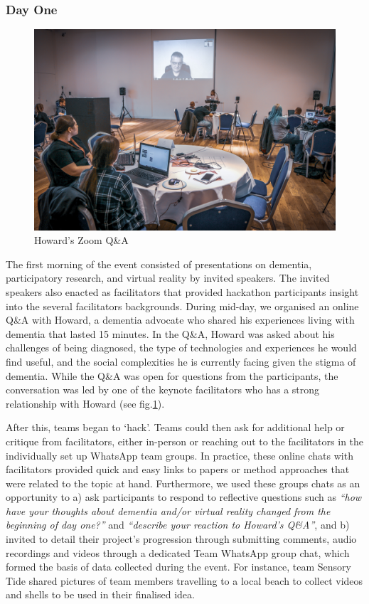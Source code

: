 \subsubsection{Day One}
\label{DayOne}

\begin{figure}[htp]
\centering
\includegraphics[width=.4\linewidth]{Images/DemVR/Howard.jpg}
\caption{Howard's Zoom Q\&A}
\label{fig:Howard}
\end{figure}
The first morning of the event consisted of presentations on dementia, participatory research, and virtual reality by invited speakers. The invited speakers also enacted as facilitators that provided hackathon participants insight into the several facilitators backgrounds. During mid-day, we organised an online Q\&A with Howard, a dementia advocate who shared his experiences living with dementia that lasted 15 minutes. In the Q\&A, Howard was asked about his challenges of being diagnosed, the type of technologies and experiences he would find useful, and the social complexities he is currently facing given the stigma of dementia. While the Q\&A was open for questions from the participants, the conversation was led by one of the keynote facilitators who has a strong relationship with Howard (see fig.\ref{fig:Howard}).

After this, teams began to `hack'. Teams could then ask for additional help or critique from facilitators, either in-person or reaching out to the facilitators in the individually set up WhatsApp team groups. In practice, these online chats with facilitators provided quick and easy links to papers or method approaches that were related to the topic at hand. Furthermore, we used these groups chats as an opportunity to a) ask participants to respond to reflective questions such as \textit{``how have your thoughts about dementia and/or virtual reality changed from the beginning of day one?''} and \textit{``describe your reaction to Howard’s Q\&A''}, and b) invited to detail their project’s progression through submitting comments, audio recordings and videos through a dedicated Team WhatsApp group chat, which formed the basis of data collected during the event. For instance, team Sensory Tide shared pictures of team members travelling to a local beach to collect videos and shells to be used in their finalised idea.

